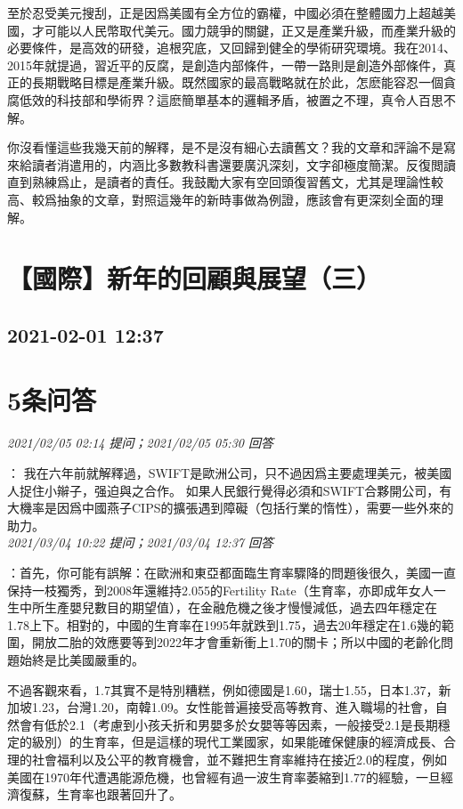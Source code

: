 \documentclass[twocolumn]{ctexart}
\begin{document}
至於忍受美元搜刮，正是因爲美國有全方位的霸權，中國必須在整體國力上超越美國，才可能以人民幣取代美元。國力競爭的關鍵，正又是產業升級，而產業升級的必要條件，是高效的研發，追根究底，又回歸到健全的學術研究環境。我在2014、2015年就提過，習近平的反腐，是創造内部條件，一帶一路則是創造外部條件，真正的長期戰略目標是產業升級。既然國家的最高戰略就在於此，怎麽能容忍一個貪腐低效的科技部和學術界？這麽簡單基本的邏輯矛盾，被置之不理，真令人百思不解。

你沒看懂這些我幾天前的解釋，是不是沒有細心去讀舊文？我的文章和評論不是寫來給讀者消遣用的，内涵比多數教科書還要廣汎深刻，文字卻極度簡潔。反復閲讀直到熟練爲止，是讀者的責任。我鼓勵大家有空回頭復習舊文，尤其是理論性較高、較爲抽象的文章，對照這幾年的新時事做為例證，應該會有更深刻全面的理解。
\\


\section{【國際】新年的回顧與展望（三）}
\subsection{2021-02-01 12:37}


\section{5条问答}

\textit{\hfill\noindent\small 2021/02/05 02:14 提问；2021/02/05 05:30 回答}

：
我在六年前就解釋過，SWIFT是歐洲公司，只不過因爲主要處理美元，被美國人捉住小辮子，强迫與之合作。
如果人民銀行覺得必須和SWIFT合夥開公司，有大機率是因爲中國燕子CIPS的擴張遇到障礙（包括行業的惰性），需要一些外來的助力。
\\

\textit{\hfill\noindent\small 2021/03/04 10:22 提问；2021/03/04 12:37 回答}

：首先，你可能有誤解：在歐洲和東亞都面臨生育率驟降的問題後很久，美國一直保持一枝獨秀，到2008年還維持2.055的Fertility Rate（生育率，亦即成年女人一生中所生產嬰兒數目的期望值），在金融危機之後才慢慢減低，過去四年穩定在1.78上下。相對的，中國的生育率在1995年就跌到1.75，過去20年穩定在1.6幾的範圍，開放二胎的效應要等到2022年才會重新衝上1.70的關卡；所以中國的老齡化問題始終是比美國嚴重的。

不過客觀來看，1.7其實不是特別糟糕，例如德國是1.60，瑞士1.55，日本1.37，新加坡1.23，台灣1.20，南韓1.09。女性能普遍接受高等教育、進入職場的社會，自然會有低於2.1（考慮到小孩夭折和男嬰多於女嬰等等因素，一般接受2.1是長期穩定的級別）的生育率，但是這樣的現代工業國家，如果能確保健康的經濟成長、合理的社會福利以及公平的教育機會，並不難把生育率維持在接近2.0的程度，例如美國在1970年代遭遇能源危機，也曾經有過一波生育率萎縮到1.77的經驗，一旦經濟復蘇，生育率也跟著回升了。
\end{document}
